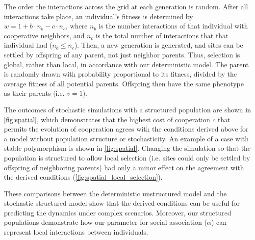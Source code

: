 \documentclass[12pt]{extarticle}
\begin{document}
The order the interactions across the grid at each generation is random.
After all interactions take place, an individual's fitness is determined by
$w = 1 + b \cdot n_b - c \cdot n_c$,
where $n_b$ is the number interactions of that individual with cooperative neighbors, and $n_c$ is the total number of interactions that that individual  had ($n_b \le n_c$).
Then, a new generation is generated, and sites can be settled by offspring of any parent, not just neighbor parents. Thus, selection is global, rather than local, in accordance with our deterministic model.
The parent is randomly drawn with probability proportional to its fitness, divided by the average fitness of all potential parents.
Offspring then have the same phenotype as their parents (i.e. $v=1$).

The outcomes of stochastic simulations with a structured population are shown in \autoref{fig:spatial}, which demonstrates that the highest cost of cooperation $c$ that permits the evolution of cooperation agrees with the conditions derived above for a model without population structure or stochasticity.
An example of a case with stable polymorphism is shown in \autoref{fig:spatial}.
Changing the simulation so that the population is structured to allow local selection (i.e. sites could only be settled by offspring of neighboring parents) had only a minor effect on the agreement with the derived conditions (\autoref{fig:spatial_local_selection}).

These comparisons between the deterministic unstructured model and the stochastic structured model show that the derived conditions can be useful for predicting the dynamics under complex scenarios. 
Moreover, our structured populations demonstrate how our parameter for social association ($\alpha$) can represent local interactions between individuals.


\end{document}
